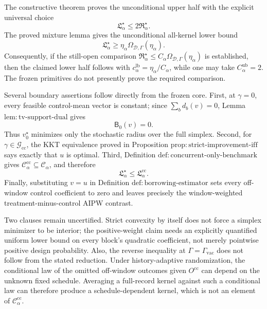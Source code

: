 The constructive theorem proves the unconditional upper half with the explicit universal choice
\[
\mathfrak L_\alpha^\star\le2\mathfrak R_\alpha^\star.
\]
The proved mixture lemma gives the unconditional all-kernel lower bound
\[
\mathfrak L_\alpha^\star\ge
\eta_\alpha\Omega_{\mathcal D,\Gamma}(\eta_\alpha).
\]
Consequently, if the still-open comparison
\(\mathfrak R_\alpha^\star\le C_\alpha
\Omega_{\mathcal D,\Gamma}(\eta_\alpha)\) is established, then the claimed lower half follows with
\(c_\alpha^{\mathrm{lb}}=\eta_\alpha/C_\alpha\), while one may take
\(C_\alpha^{\mathrm{ub}}=2\).  The frozen primitives do not presently prove the required comparison.

Several boundary assertions follow directly from the frozen core.  First, at \(\gamma=0\), every feasible control-mean vector is constant; since \(\sum_bd_b(v)=0\), Lemma \(\mathrm{lem:tv\text{-}support\text{-}dual}\) gives
\[
\mathsf B_0(v)=0.
\]
Thus \(v_0^\star\) minimizes only the stochastic radius over the full simplex.  Second, for \(\gamma\in\mathcal G_{\mathrm{cc}}\), the KKT equivalence proved in Proposition \(\mathrm{prop:strict\text{-}improvement\text{-}iff}\) says exactly that \(u\) is optimal.  Third, Definition \(\mathrm{def:concurrent\text{-}only\text{-}benchmark}\) gives \(\mathcal C_\alpha^{\mathrm{cc}}\subseteq\mathcal C_\alpha\), and therefore
\[
\mathfrak L_\alpha^\star\le\mathfrak L_\alpha^{\mathrm{cc}}.
\]
Finally, substituting \(v=u\) in Definition \(\mathrm{def:borrowing\text{-}estimator}\) sets every off-window control coefficient to zero and leaves precisely the window-weighted treatment-minus-control AIPW contrast.

Two clauses remain uncertified.  Strict convexity by itself does not force a simplex minimizer to be interior; the positive-weight claim needs an explicitly quantified uniform lower bound on every block's quadratic coefficient, not merely pointwise positive design probability.  Also, the reverse inequality at \(\Gamma=\Gamma_{\mathrm{vac}}\) does not follow from the stated reduction.  Under history-adaptive randomization, the conditional law of the omitted off-window outcomes given \(O^{\mathrm{cc}}\) can depend on the unknown fixed schedule.  Averaging a full-record kernel against such a conditional law can therefore produce a schedule-dependent kernel, which is not an element of \(\mathcal C_\alpha^{\mathrm{cc}}\).
